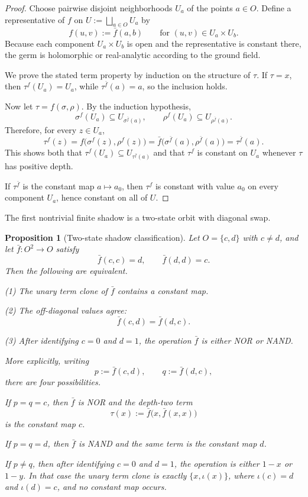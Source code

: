 \documentclass[11pt]{amsart}
\numberwithin{equation}{section}
\newtheorem{proposition}[theorem]{Proposition}
\theoremstyle{remark}
\theoremstyle{definition}
\begin{document}
\begin{proof}
Choose pairwise disjoint neighborhoods $U_a$ of the points $a\in O$. Define a representative of $f$ on $U:=\bigsqcup_{a\in O}U_a$ by
\[
f(u,v):=\bar f(a,b)\qquad\text{for }(u,v)\in U_a\times U_b.
\]
Because each component $U_a\times U_b$ is open and the representative is constant there, the germ is holomorphic or real-analytic according to the ground field.

We prove the stated term property by induction on the structure of $\tau$. If $\tau=x$, then $\tau^f(U_a)=U_a$, while $\tau^{\bar f}(a)=a$, so the inclusion holds.

Now let $\tau=f(\sigma,\rho)$. By the induction hypothesis,
\[
\sigma^f(U_a)\subseteq U_{\sigma^{\bar f}(a)},\qquad \rho^f(U_a)\subseteq U_{\rho^{\bar f}(a)}.
\]
Therefore, for every $z\in U_a$,
\[
\tau^f(z)=f\bigl(\sigma^f(z),\rho^f(z)\bigr)=\bar f\bigl(\sigma^{\bar f}(a),\rho^{\bar f}(a)\bigr)=\tau^{\bar f}(a).
\]
This shows both that $\tau^f(U_a)\subseteq U_{\tau^{\bar f}(a)}$ and that $\tau^f$ is constant on $U_a$ whenever $\tau$ has positive depth.

If $\tau^{\bar f}$ is the constant map $a\mapsto a_0$, then $\tau^f$ is constant with value $a_0$ on every component $U_a$, hence constant on all of $U$.
\end{proof}

The first nontrivial finite shadow is a two-state orbit with diagonal swap.

\begin{proposition}[Two-state shadow classification]\label{prop:two-state-shadow}
Let $O=\{c,d\}$ with $c\neq d$, and let $\bar f\colon O^2\to O$ satisfy
\[
\bar f(c,c)=d,\qquad \bar f(d,d)=c.
\]
Then the following are equivalent.

\smallskip
\noindent (1) The unary term clone of $\bar f$ contains a constant map.

\smallskip
\noindent (2) The off-diagonal values agree:
\[
\bar f(c,d)=\bar f(d,c).
\]

\smallskip
\noindent (3) After identifying $c=0$ and $d=1$, the operation $\bar f$ is either NOR or NAND.

\smallskip
More explicitly, writing
\[
p:=\bar f(c,d),\qquad q:=\bar f(d,c),
\]
there are four possibilities.

If $p=q=c$, then $\bar f$ is NOR and the depth-two term
\[
\tau(x):=\bar f\bigl(x,\bar f(x,x)\bigr)
\]
is the constant map $c$.

If $p=q=d$, then $\bar f$ is NAND and the same term is the constant map $d$.

If $p\neq q$, then after identifying $c=0$ and $d=1$, the operation is either $1-x$ or $1-y$. In that case the unary term clone is exactly $\{x,\iota(x)\}$, where $\iota(c)=d$ and $\iota(d)=c$, and no constant map occurs.
\end{proposition}
\end{document}
